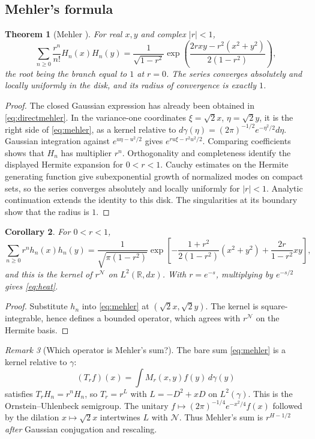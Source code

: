 \documentclass[11pt,reqno]{amsart}
\newtheorem{theorem}{Theorem}[section]
\newtheorem{corollary}[theorem]{Corollary}
\theoremstyle{definition}
\theoremstyle{remark}
\newtheorem{remark}[theorem]{Remark}
\newcommand{\R}{\mathbb R}
\newcommand{\NN}{\mathcal N}
\begin{document}
\subsection{Mehler's formula}
\begin{theorem}[Mehler \cite{Mehler1866}]\label{thm:mehler}
For real $x,y$ and complex $|r|<1$,
\begin{equation}\label{eq:mehler}
\sum_{n\ge0}\frac{r^n}{n!}H_n(x)H_n(y)
=\frac1{\sqrt{1-r^2}}
\exp\left(\frac{2rxy-r^2(x^2+y^2)}{2(1-r^2)}\right),
\end{equation}
the root being the branch equal to $1$ at $r=0$. The series converges
absolutely and locally uniformly in the disk, and its radius of
convergence is exactly $1$.
\end{theorem}
\begin{proof}
The closed Gaussian expression has already been obtained in
\eqref{eq:directmehler}. In the variance-one coordinates
$\xi=\sqrt2x$, $\eta=\sqrt2y$, it is the right side of
\eqref{eq:mehler}, as a kernel relative to
$d\gamma(\eta)=(2\pi)^{-1/2}e^{-\eta^2/2}d\eta$.
Gaussian integration against $e^{u\eta-u^2/2}$ gives
$e^{ru\xi-r^2u^2/2}$. Comparing coefficients shows that $H_n$ has
multiplier $r^n$. Orthogonality and completeness identify the displayed
Hermite expansion for $0<r<1$. Cauchy estimates on the Hermite
generating function give subexponential growth of normalized modes on
compact sets, so the series converges absolutely and locally uniformly
for $|r|<1$. Analytic continuation extends the identity to this disk.
The singularities at its boundary show that the radius is $1$.
\end{proof}

\begin{corollary}\label{cor:mehlerL2}
For $0<r<1$,
\begin{equation}\label{eq:mehlernorm}
\sum_{n\ge0}r^nh_n(x)h_n(y)
=\frac1{\sqrt{\pi(1-r^2)}}
\exp\left[-\frac{1+r^2}{2(1-r^2)}(x^2+y^2)+\frac{2r}{1-r^2}xy\right],
\end{equation}
and this is the kernel of $r^{\NN}$ on $L^2(\R,dx)$. With $r=e^{-s}$,
multiplying by $e^{-s/2}$ gives \eqref{eq:heat}.
\end{corollary}
\begin{proof}
Substitute $h_n$ into \eqref{eq:mehler} at $(\sqrt2x,\sqrt2y)$.
The kernel is square-integrable, hence defines a bounded operator,
which agrees with $r^{\NN}$ on the Hermite basis.
\end{proof}

\begin{remark}[Which operator is Mehler's sum?]
The bare sum \eqref{eq:mehler} is a kernel relative to $\gamma$:
\[
(T_rf)(x)=\int M_r(x,y)f(y)\,d\gamma(y)
\]
satisfies $T_rH_n=r^nH_n$, so $T_r=r^{L}$ with $L=-D^2+xD$ on
$L^2(\gamma)$. This is the Ornstein--Uhlenbeck semigroup. The unitary
$f\mapsto(2\pi)^{-1/4}e^{-x^2/4}f(x)$ followed by the dilation
$x\mapsto\sqrt2x$ intertwines $L$ with $\NN$. Thus Mehler's sum is
$r^{H-1/2}$ \emph{after} Gaussian conjugation and rescaling.
\end{remark}
\end{document}

